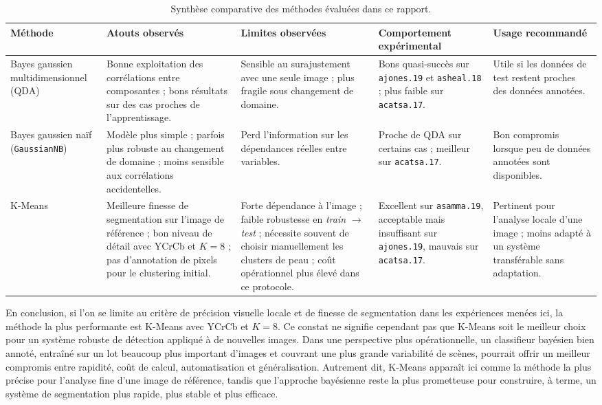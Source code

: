\begin{table}[!t]
\centering
\scriptsize
\caption{Synth\`ese comparative des m\'ethodes \'evalu\'ees dans ce rapport.}
\label{tab:final_method_comparison}
\begin{tabular}{|p{2.5cm}|p{3.3cm}|p{3.2cm}|p{2.7cm}|p{2.8cm}|}
\hline
\textbf{M\'ethode} & \textbf{Atouts observ\'es} & \textbf{Limites observ\'ees} & \textbf{Comportement exp\'erimental} & \textbf{Usage recommand\'e} \\
\hline
Bayes gaussien multidimensionnel (QDA) & Bonne exploitation des corr\'elations entre composantes ; bons r\'esultats sur des cas proches de l'apprentissage. & Sensible au surajustement avec une seule image ; plus fragile sous changement de domaine. & Bons quasi-succ\`es sur \texttt{ajones.19} et \texttt{asheal.18} ; plus faible sur \texttt{acatsa.17}. & Utile si les donn\'ees de test restent proches des donn\'ees annot\'ees. \\
\hline
Bayes gaussien na\"if (\texttt{GaussianNB}) & Mod\`ele plus simple ; parfois plus robuste au changement de domaine ; moins sensible aux corr\'elations accidentelles. & Perd l'information sur les d\'ependances r\'eelles entre variables. & Proche de QDA sur certains cas ; meilleur sur \texttt{acatsa.17}. & Bon compromis lorsque peu de donn\'ees annot\'ees sont disponibles. \\
\hline
K-Means & Meilleure finesse de segmentation sur l'image de r\'ef\'erence ; bon niveau de d\'etail avec YCrCb et \(K=8\) ; pas d'annotation de pixels pour le clustering initial. & Forte d\'ependance \`a l'image ; faible robustesse en \textit{train} \(\rightarrow\) \textit{test} ; n\'ecessite souvent de choisir manuellement les clusters de peau ; co\^ut op\'erationnel plus \'elev\'e dans ce protocole. & Excellent sur \texttt{asamma.19}, acceptable mais insuffisant sur \texttt{ajones.19}, mauvais sur \texttt{acatsa.17}. & Pertinent pour l'analyse locale d'une image ; moins adapt\'e \`a un syst\`eme transf\'erable sans adaptation. \\
\hline
\end{tabular}
\end{table}

En conclusion, si l'on se limite au crit\`ere de pr\'ecision visuelle locale et de finesse de segmentation dans les exp\'eriences men\'ees ici, la m\'ethode la plus performante est K-Means avec YCrCb et \(K=8\). Ce constat ne signifie cependant pas que K-Means soit le meilleur choix pour un syst\`eme robuste de d\'etection appliqu\'e \`a de nouvelles images. Dans une perspective plus op\'erationnelle, un classifieur bay\'esien bien annot\'e, entra\^in\'e sur un lot beaucoup plus important d'images et couvrant une plus grande variabilit\'e de sc\`enes, pourrait offrir un meilleur compromis entre rapidit\'e, co\^ut de calcul, automatisation et g\'en\'eralisation. Autrement dit, K-Means appara\^it ici comme la m\'ethode la plus pr\'ecise pour l'analyse fine d'une image de r\'ef\'erence, tandis que l'approche bay\'esienne reste la plus prometteuse pour construire, \`a terme, un syst\`eme de segmentation plus rapide, plus stable et plus efficace.
